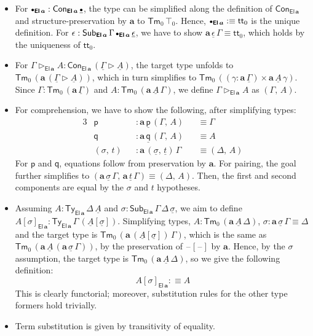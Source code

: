 \documentclass[12pt,a4paper,twoside,openany]{book}
\theoremstyle{remark}
\theoremstyle{definition}
\theoremstyle{theorem}
\newcommand{\bs}[1]{\boldsymbol{#1}}
\newcommand{\Con}{\mathsf{Con}}
\newcommand{\Sub}{\mathsf{Sub}}
\newcommand{\Tm}{\mathsf{Tm}}
\newcommand{\Ty}{\mathsf{Ty}}
\newcommand{\El}{\mathsf{El}}
\renewcommand{\tt}{\mathsf{tt}}
\newcommand{\blank}{\mathord{\hspace{1pt}\text{--}\hspace{1pt}}}
\newcommand{\ext}{\triangleright}
\newcommand{\emptycon}{\scaleobj{.75}\bullet}
\newcommand{\p}{\mathsf{p}}
\newcommand{\q}{\mathsf{q}}
\newcommand{\ba}{\bs{a}}
\newcommand{\ul}[1]{\underline{#1}}
\newcommand{\ulGamma}{\ul{\Gamma}}
\newcommand{\ulsigma}{\ul{\sigma}}
\newcommand{\ulemptycon}{\ul{\emptycon}}
\newcommand{\ult}{\ul{t}}
\newcommand{\ulA}{\ul{A}}
\newcommand{\defn}{:\equiv}
\begin{document}
\begin{itemize}
  \item
  For $\emptycon_{\bs{\El\,a}} : \Con_{\bs{\El\,a}}\,\ulemptycon$, the type can
  be simplified along the definition of $\Con_{\bs{\El\,a}}$ and
  structure-preservation by $\ba$ to $\Tm_0\,\top_0$. Hence,
  $\emptycon_{\bs{\El\,a}} \defn \tt_0$ is the unique definition. For $\epsilon
  : \Sub_{\bs{\El\,a}}\,\Gamma\,\emptycon_{\bs{\El\,a}}\,\ul{\epsilon}$, we have to show
  $\ba\,\ul{\epsilon}\,\Gamma \equiv \tt_0$, which holds by the uniqueness of $\tt_0$.


  \item
  For $\Gamma \ext_{\bs{\El\,a}} A : \Con_{\bs{\El\,a}}\,(\ulGamma \ext \ulA)$,
  the target type unfolds to $\Tm_0\,(\ba\,(\ulGamma \ext \ulA))$, which in
  turn simplifies to $\Tm_0\,((\gamma : \ba\,\ulGamma) \times \ba\,\ulA\,\gamma)$.
  Since $\Gamma : \Tm_0\,(\ba\,\ulGamma)$ and $A : \Tm_0\,(\ba\,\ulA\,\Gamma)$,
  we define $\Gamma \ext_{\bs{\El\,a}} A$ as $(\Gamma,\,A)$.

  \item
  For comprehension, we have to show the following, after simplifying types:
  \begin{alignat*}{3}
    & \p &&: \ba\,\ul{\p}\,(\Gamma,\,A) &&\equiv \Gamma \\
    & \q &&: \ba\,\ul{\q}\,(\Gamma,\,A) &&\equiv A \\
    & (\sigma,\,t) &&: \ba\,(\ulsigma,\,\ult)\,\Gamma &&\equiv (\Delta,\,A)
  \end{alignat*}
  For $\p$ and $\q$, equations follow from preservation by $\ba$. For pairing,
  the goal further simplifies to $(\ba\,\ulsigma\,\Gamma,\,\ba\,\ult\,\Gamma)
  \equiv (\Delta,\,A)$. Then, the first and second components are equal by
  the $\sigma$ and $t$ hypotheses.

  \item
  Assuming $A : \Ty_{\bs{\El\,a}}\,\Delta\,\ulA$ and $\sigma :
  \Sub_{\bs{\El\,a}}\,\Gamma\,\Delta\,\ulsigma$, we aim to define
  $A[\sigma]_{\bs{\El\,a}} :
  \Ty_{\bs{\El\,a}}\,\Gamma\,(\ulA[\ulsigma])$. Simplifying types, $A :
  \Tm_0\,(\ba\,\ulA\,\Delta)$, $\sigma : \ba\,\ulsigma\,\Gamma \equiv \Delta$
  and the target type is $\Tm_0\,(\ba\,(\ulA[\ulsigma])\,\Gamma)$, which is the
  same as $\Tm_0\,(\ba\,\ulA\,(\ba\,\ulsigma\,\Gamma))$, by the preservation of
  $\blank[\blank]$ by $\ba$. Hence, by the $\sigma$ assumption, the target
  type is $\Tm_0\,(\ba\,\ulA\,\Delta)$, so we give the following definition:
  \[
    A[\sigma]_{\bs{\El\,a}} \defn A
  \]
  This is clearly functorial; moreover, substitution rules for the other type
  formers hold trivially.
  \item Term substitution is given by transitivity of equality.


\end{itemize}
\end{document}
